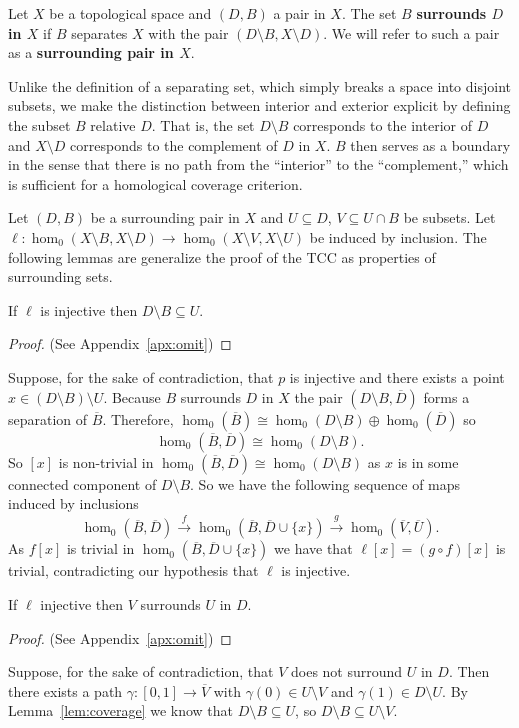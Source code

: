 
Let $X$ be a topological space and $(D,B)$ a pair in $X$.
The set $B$ \textbf{surrounds $D$ in $X$} if $B$ separates $X$ with the pair $(D\setminus B, X\setminus D)$.
We will refer to such a pair as a \textbf{surrounding pair in $X$}.

Unlike the definition of a separating set, which simply breaks a space into disjoint subsets, we make the distinction between interior and exterior explicit by defining the subset $B$ relative $D$.
That is, the set $D\setminus B$ corresponds to the interior of $D$ and $X\setminus D$ corresponds to the complement of $D$ in $X$.
$B$ then serves as a boundary in the sense that there is no path from the ``interior'' to the ``complement,'' which is sufficient for a homological coverage criterion.

Let $(D, B)$ be a surrounding pair in $X$ and $U\subseteq D$, $V\subseteq U\cap B$ be subsets.
Let $\ell: \hom_0(X\setminus B, X\setminus D)\to \hom_0(X\setminus V, X\setminus U)$ be induced by inclusion.
The following lemmas are generalize the proof of the TCC as properties of surrounding sets.

\begin{lemma}\label{lem:coverage}
  If $\ell$ is injective then $D\setminus B\subseteq U$.
\end{lemma}
\begin{proof}
  (See Appendix~\ref{apx:omit})
\end{proof}
\proofatend
    Suppose, for the sake of contradiction, that $p$ is injective and there exists a point $x\in (D\setminus B)\setminus U$.
    Because $B$ surrounds $D$ in $X$ the pair $(D\setminus B, \overline{D})$ forms a separation of $\overline{B}$.
    Therefore, $\hom_0(\overline{B})\cong \hom_0(D\setminus B)\oplus \hom_0(\overline{D})$ so
    \[ \hom_0(\overline{B}, \overline{D})\cong \hom_0(D\setminus B). \]
    So $[x]$ is non-trivial in $\hom_0(\overline{B},\overline{D})\cong \hom_0(D\setminus B)$ as $x$ is in some connected component of $D\setminus B$.
    So we have the following sequence of maps induced by inclusions
    \[ \hom_0(\overline{B},\overline{D})\xrightarrow{f} \hom_0(\overline{B},\overline{D}\cup\{x\})\xrightarrow{g} \hom_0(\overline{V},\overline{U}).\]
    As $f[x]$ is trivial in $\hom_0(\overline{B},\overline{D}\cup\{x\})$ we have that $\ell[x] = (g\circ f)[x]$ is trivial, contradicting our hypothesis that $\ell$ is injective.
\endproofatend

\begin{lemma}\label{lem:cov_surrounds}
  If $\ell$ injective then $V$ surrounds $U$ in $D$.
\end{lemma}
\begin{proof}
  (See Appendix~\ref{apx:omit})
\end{proof}
\proofatend
  Suppose, for the sake of contradiction, that $V$ does not surround $U$ in $D$.
  Then there exists a path $\gamma : [0,1]\to\overline{V}$ with $\gamma(0)\in U\setminus V$ and $\gamma(1)\in D\setminus U$.
  By Lemma~\ref{lem:coverage} we know that $D\setminus B\subseteq U$, so $D\setminus B\subseteq U\setminus V$.

